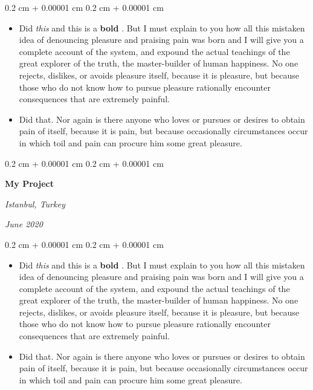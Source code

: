 \documentclass[10pt, letterpaper]{article}
\newenvironment{highlights}{
    \begin{itemize}[
        topsep=0.10 cm,
        parsep=0.10 cm,
        partopsep=0pt,
        itemsep=0pt,
        leftmargin=0.4 cm + 10pt
    ]
}{
    \end{itemize}
} %
\newenvironment{onecolentry}{
    \begin{adjustwidth}{
        0.2 cm + 0.00001 cm
    }{
        0.2 cm + 0.00001 cm
    }
}{
    \end{adjustwidth}
} %
\newenvironment{twocolentry}[2][]{
    \onecolentry
    \def\secondColumn{#2}
    \setcolumnwidth{\fill, 4.5 cm}
    \begin{paracol}{2}
}{
    \switchcolumn \raggedleft \secondColumn
    \end{paracol}
    \endonecolentry
} %
\let\hrefWithoutArrow\href
\renewcommand{\href}[2]{\hrefWithoutArrow{#1}{\ifthenelse{\equal{#2}{}}{ }{#2 }\raisebox{.15ex}{\footnotesize \faExternalLink*}}}
\begin{document}
        \vspace{0.10 cm}
        \begin{onecolentry}
            \begin{highlights}
                \item Did \textit{this} and this is a \textbf{bold} \href{https://example.com}{link}. But I must explain to you how all this mistaken idea of denouncing pleasure and praising pain was born and I will give you a complete account of the system, and expound the actual teachings of the great explorer of the truth, the master-builder of human happiness. No one rejects, dislikes, or avoids pleasure itself, because it is pleasure, but because those who do not know how to pursue pleasure rationally encounter consequences that are extremely painful.
                \item Did that. Nor again is there anyone who loves or pursues or desires to obtain pain of itself, because it is pain, but because occasionally circumstances occur in which toil and pain can procure him some great pleasure.
            \end{highlights}
        \end{onecolentry}


        \vspace{0.2 cm}

        \begin{twocolentry}{
        \textit{Istanbul, Turkey}    
            
        \textit{June 2020}}
            \textbf{My Project}
        \end{twocolentry}

        \vspace{0.10 cm}
        \begin{onecolentry}
            \begin{highlights}
                \item Did \textit{this} and this is a \textbf{bold} \href{https://example.com}{link}. But I must explain to you how all this mistaken idea of denouncing pleasure and praising pain was born and I will give you a complete account of the system, and expound the actual teachings of the great explorer of the truth, the master-builder of human happiness. No one rejects, dislikes, or avoids pleasure itself, because it is pleasure, but because those who do not know how to pursue pleasure rationally encounter consequences that are extremely painful.
                \item Did that. Nor again is there anyone who loves or pursues or desires to obtain pain of itself, because it is pain, but because occasionally circumstances occur in which toil and pain can procure him some great pleasure.
            \end{highlights}
        \end{onecolentry}
\end{document}
